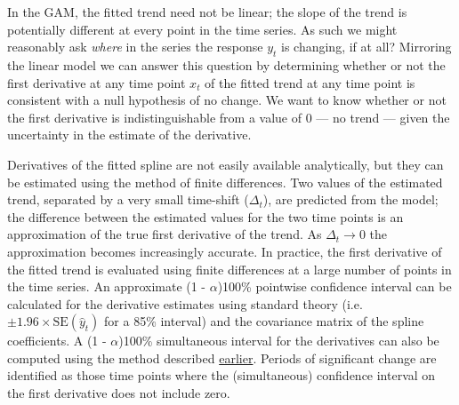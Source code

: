 \documentclass[12pt,]{article}
\begin{document}
In the GAM, the fitted trend need not be linear; the slope of the trend
is potentially different at every point in the time series. As such we
might reasonably ask \emph{where} in the series the response \(y_t\) is
changing, if at all? Mirroring the linear model we can answer this
question by determining whether or not the first derivative at any time
point \(x_t\) of the fitted trend at any time point is consistent with a
null hypothesis of no change. We want to know whether or not the first
derivative is indistinguishable from a value of \(0\) --- no trend ---
given the uncertainty in the estimate of the derivative.

Derivatives of the fitted spline are not easily available analytically,
but they can be estimated using the method of finite differences. Two
values of the estimated trend, separated by a very small time-shift
(\(\Delta_t\)), are predicted from the model; the difference between the
estimated values for the two time points is an approximation of the true
first derivative of the trend. As \(\Delta_t \rightarrow 0\) the
approximation becomes increasingly accurate. In practice, the first
derivative of the fitted trend is evaluated using finite differences at
a large number of points in the time series. An approximate (1 -
\(\alpha\))100\% pointwise confidence interval can be calculated for the
derivative estimates using standard theory
(i.e.~\(\pm 1.96 \times \text{SE}(\hat{y}_t)\) for a 85\% interval) and
the covariance matrix of the spline coefficients. A (1 -
\(\alpha\))100\% simultaneous interval for the derivatives can also be
computed using the method described
\protect\hyperlink{confints}{earlier}. Periods of significant change are
identified as those time points where the (simultaneous) confidence
interval on the first derivative does not include zero.
\end{document}
